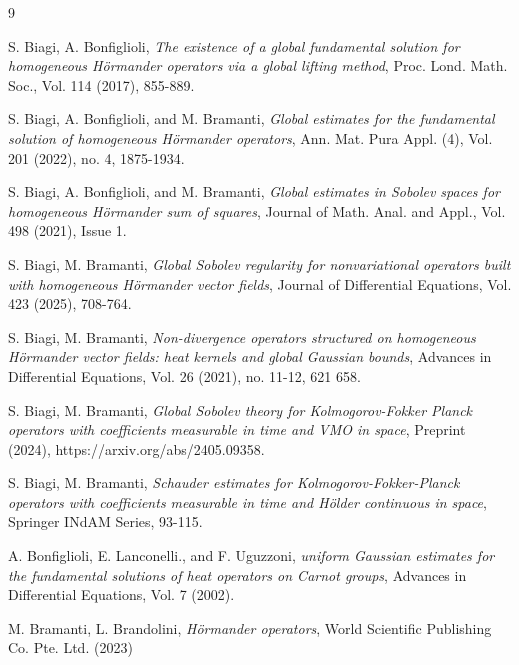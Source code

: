 \documentclass{article}
\numberwithin{equation}{section}
\begin{document}
\begin{thebibliography}{9}


 S. Biagi, A. Bonfiglioli, \emph{The existence of a global fundamental solution for
 homogeneous Hörmander operators via a global lifting method}, Proc. Lond.
 Math. Soc., Vol. 114 (2017), 855-889.

S. Biagi, A. Bonfiglioli, and M. Bramanti, \emph{Global estimates for the fundamental
 solution of homogeneous Hörmander operators}, Ann. Mat. Pura Appl. (4), Vol. 201 (2022), no. 4, 1875-1934.

 S. Biagi, A. Bonfiglioli, and M. Bramanti, \emph{Global estimates in Sobolev spaces
 for homogeneous Hörmander sum of squares}, Journal of Math. Anal. and
 Appl., Vol. 498 (2021), Issue 1.

 S. Biagi, M. Bramanti, \emph{Global Sobolev regularity for nonvariational
 operators built with homogeneous Hörmander vector fields}, Journal of
 Differential Equations, Vol. 423 (2025), 708-764.

S. Biagi, M. Bramanti, \emph{Non-divergence operators structured on homogeneous Hörmander vector fields: heat kernels and global Gaussian bounds}, Advances in Differential Equations, Vol. 26 (2021), no. 11-12, 621 658.

  S. Biagi, M. Bramanti, \emph{Global Sobolev theory for Kolmogorov-Fokker
Planck operators with coefficients measurable in time and VMO in space},
 Preprint (2024), https://arxiv.org/abs/2405.09358.

 S. Biagi, M. Bramanti, \emph{Schauder estimates for Kolmogorov-Fokker-Planck operators with coefficients measurable in time and Hölder continuous in space}, Springer INdAM Series, 93-115. 

 A. Bonfiglioli, E. Lanconelli., and F. Uguzzoni, \emph{uniform Gaussian estimates for the fundamental solutions of heat operators on Carnot groups}, Advances in Differential Equations, Vol. 7 (2002).

 M. Bramanti, L. Brandolini, \emph{Hörmander operators}, World Scientific Publishing Co. Pte. Ltd. (2023)



\end{thebibliography}
\end{document}

